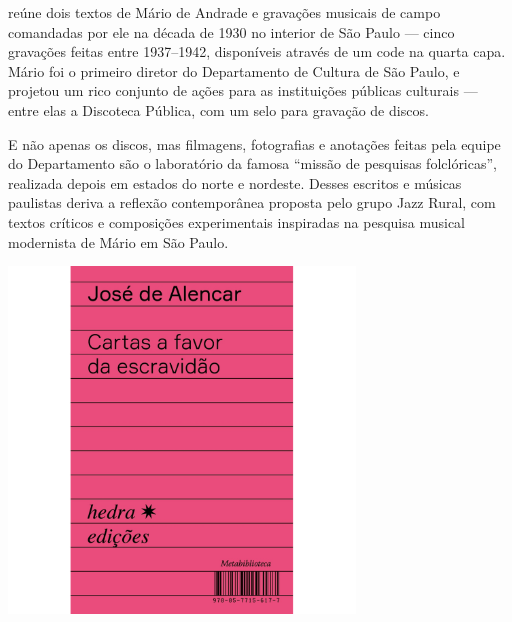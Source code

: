 \medskip

 reúne dois textos de Mário de Andrade e gravações musicais de campo comandadas por ele na década de 1930 no interior de São Paulo --- cinco gravações feitas entre 1937--1942, disponíveis através de um  code na quarta capa. Mário foi o primeiro diretor do Departamento de Cultura de São Paulo, e projetou um rico conjunto de ações para as instituições públicas culturais --- entre elas a Discoteca Pública, com um selo para gravação de discos.

E não apenas os discos, mas filmagens, fotografias e anotações feitas pela equipe do Departamento são o laboratório da famosa “missão de pesquisas folclóricas”, realizada depois em estados do norte e nordeste. Desses escritos e músicas paulistas deriva a reflexão contemporânea proposta pelo grupo Jazz Rural, com textos críticos e composições experimentais inspiradas na pesquisa musical modernista de Mário em São Paulo.

\vfill

\hspace*{-.4cm}\begin{minipage}[c]{.5\linewidth}
\small{
{}}
\end{minipage}

\pagebreak


\begin{center}
\hspace*{-2.5cm}
\hspace*{2.5cm}\includegraphics[width=92mm]{./grid/alencar.jpg}
\end{center}

